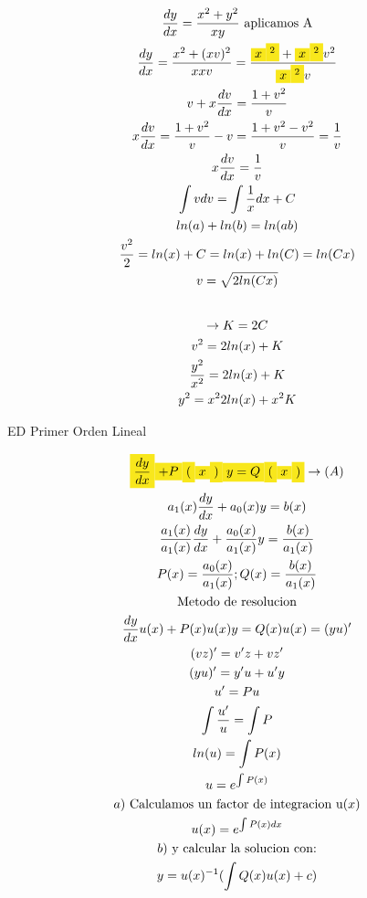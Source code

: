 \documentclass{article}
\begin{document}
\begin{gather*}
\frac{dy}{dx} = \frac{x^{2}+y^{2}}{xy}\text{  aplicamos A} \\
\frac{dy}{dx} = \frac{x^{2}+(xv)^{2}}{xxv} = \frac{\text{\colorbox[RGB]{248,231,28}{$x$}}\text{\colorbox[RGB]{248,231,28}{$^{2}$}}+\text{\colorbox[RGB]{248,231,28}{$x$}}\text{\colorbox[RGB]{248,231,28}{$^{2}$}}v^{2}}{\text{\colorbox[RGB]{248,231,28}{$x$}}\text{\colorbox[RGB]{248,231,28}{$^{2}$}}v} \\
v+x\frac{dv}{dx}=\frac{1+v^{2}}{v} \\
x\frac{dv}{dx}=\frac{1+v^{2}}{v}-v = \frac{1+v^{2}-v^{2}}{v} =\frac{1}{v} \\
x\frac{dv}{dx}=\frac{1}{v} \\
\int vdv=\int \frac{1}{x}dx+C \\
ln(a)+ln(b) = ln(ab) \\
\frac{v^{2}}{2} = ln(x)+C  =   ln(x)+ln(C) = ln(Cx) \\
v = \sqrt{2ln(Cx)} \\
\vspace{0.5em} \\
 \rightarrow  K=2C \\
v^{2} = 2ln(x)+K \\
\frac{y^{2}}{x^{2}}= 2ln(x)+K \\
y^{2} =x^{2}2ln(x)+x^{2}K
\end{gather*}




ED Primer Orden Lineal


\begin{gather*}
\text{\colorbox[RGB]{248,231,28}{$\frac{dy}{dx}$}}\text{\colorbox[RGB]{248,231,28}{$ + P$}}\text{\colorbox[RGB]{248,231,28}{$($}}\text{\colorbox[RGB]{248,231,28}{$x$}}\text{\colorbox[RGB]{248,231,28}{$)$}}\text{\colorbox[RGB]{248,231,28}{$y = Q$}}\text{\colorbox[RGB]{248,231,28}{$($}}\text{\colorbox[RGB]{248,231,28}{$x$}}\text{\colorbox[RGB]{248,231,28}{$)$}}    \rightarrow  (A) \\
a_{1}(x)\frac{dy}{dx} + a_{0}(x)y = b(x) \\
\frac{a_{1}(x)}{a_{1}(x)}\frac{dy}{dx} + \frac{a_{0}(x)}{a_{1}(x)}y = \frac{b(x)}{a_{1}(x)} \\
P(x) =\frac{a_{0}(x)}{a_{1}(x)}     ; Q(x) = \frac{b(x)}{a_{1}(x)} \\
\text{Metodo de resolucion} \\
\frac{dy}{dx}u(x) + P(x)u(x)y = Q(x)u(x) = (yu)' \\
(vz)' = v'z+vz' \\
(yu)'=y'u+u'y \\
u'=Pu \\
\int \frac{u'}{u}=\int P \\
ln(u) = \int P(x) \\
u = e^{\int P(x)} \\
a)\text{ Calculamos un factor de integracion u}(x) \\
u(x) = e^{\int P(x)dx} \\
b)\text{ y calcular la solucion con:} \\
y = u(x) ^{-1}(\int Q(x)u(x) +c)
\end{gather*}
\end{document}
